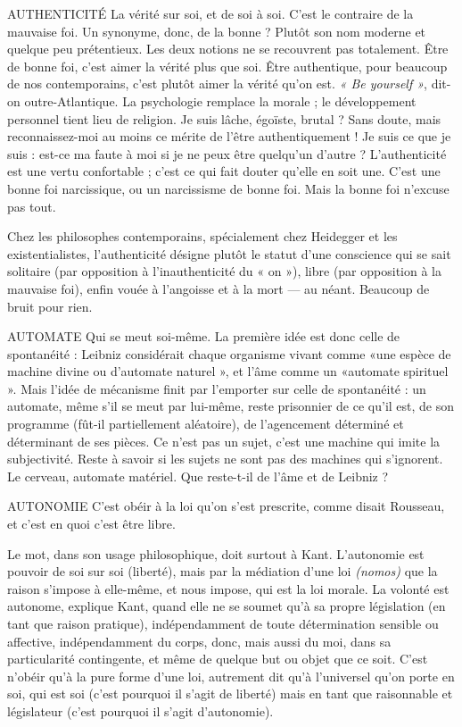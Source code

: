 AUTHENTICITÉ La vérité sur soi, et de soi à soi. C’est le contraire de la
mauvaise foi. Un synonyme, donc, de la bonne ? Plutôt
son nom moderne et quelque peu prétentieux. Les deux notions ne se recouvrent
pas totalement. Être de bonne foi, c’est aimer la vérité plus que soi. Être
authentique, pour beaucoup de nos contemporains, c’est plutôt aimer la vérité
qu’on est. {\it « Be yourself »}, dit-on outre-Atlantique. La psychologie remplace la
morale ; le développement personnel tient lieu de religion. Je suis lâche,
égoïste, brutal ? Sans doute, mais reconnaissez-moi au moins ce mérite de l’être
authentiquement ! Je suis ce que je suis : est-ce ma faute à moi si je ne peux être
quelqu'un d’autre ? L’authenticité est une vertu confortable ; c’est ce qui fait
douter qu’elle en soit une. C’est une bonne foi narcissique, ou un narcissisme
de bonne foi. Mais la bonne foi n’excuse pas tout.

Chez les philosophes contemporains, spécialement chez Heidegger et les
existentialistes, l’authenticité désigne plutôt le statut d’une conscience qui se
sait solitaire (par opposition à l’inauthenticité du « on »), libre (par opposition
à la mauvaise foi), enfin vouée à l’angoisse et à la mort — au néant. Beaucoup
de bruit pour rien.

AUTOMATE Qui se meut soi-même. La première idée est donc celle de spontanéité :
Leibniz considérait chaque organisme vivant comme
«une espèce de machine divine ou d’automate naturel », et l’âme comme un
«automate spirituel ». Mais l’idée de mécanisme finit par l'emporter sur celle
de spontanéité : un automate, même s’il se meut par lui-même, reste prisonnier
de ce qu’il est, de son programme (fût-il partiellement aléatoire), de l’agencement
déterminé et déterminant de ses pièces. Ce n’est pas un sujet, c’est une
machine qui imite la subjectivité. Reste à savoir si les sujets ne sont pas des
machines qui s’ignorent. Le cerveau, automate matériel. Que reste-t-il de l'âme
et de Leibniz ?

AUTONOMIE C'est obéir à la loi qu’on s’est prescrite, comme disait Rousseau,
et c’est en quoi c’est être libre.

Le mot, dans son usage philosophique, doit surtout à Kant. L’autonomie
est pouvoir de soi sur soi (liberté), mais par la médiation d’une loi {\it (nomos)}
que la raison s'impose à elle-même, et nous impose, qui est la loi morale. La
volonté est autonome, explique Kant, quand elle ne se soumet qu'à sa
propre législation (en tant que raison pratique), indépendamment de toute
détermination sensible ou affective, indépendamment du corps, donc, mais
aussi du moi, dans sa particularité contingente, et même de quelque but ou
objet que ce soit. C’est n’obéir qu’à la pure forme d’une loi, autrement dit
qu’à l’universel qu’on porte en soi, qui est soi (c’est pourquoi il s’agit de
liberté) mais en tant que raisonnable et législateur (c’est pourquoi il s’agit
d'autonomie).

